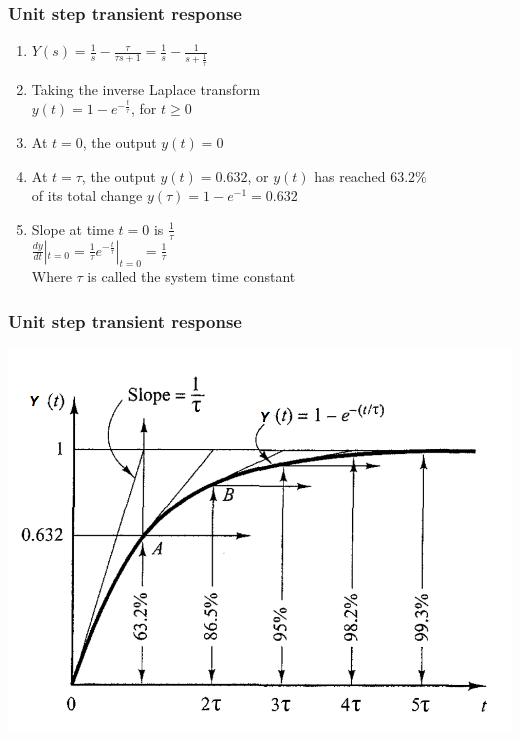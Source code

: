 \begin{frame}
\frametitle{Unit step transient response}
\begin{enumerate}
\item$Y(s)= \frac{1}{s} - \frac{\tau}{\tau s +1} = \frac{1}{s} - \frac{1}{s+\frac{1}{\tau}}$
\vspace{0.2cm}
\item Taking the inverse Laplace transform
\vspace{0.2cm}
\\ $y(t) = 1 - e^{-\frac{t}{\tau}}$, for $t\ge 0$ 
\vspace{0.2cm}
\item At $t=0$, the output $y(t)=0$
\vspace{0.2cm}
\item At $t=\tau$, the output $y(t)=0.632$, or $y(t)$ has reached $63.2\% $ 
\vspace{0.01cm} 
\\ of its total change $y(\tau)= 1 - e^{-1} = 0.632$
\vspace{0.2cm}
\item Slope at time $t=0$ is $\frac{1}{\tau}$
\vspace{0.2cm}
\\ $\frac{dy}{dt}|_{t=0} = \frac{1}{\tau}e^{-\frac{t}{\tau}}|_{t=0} = \frac{1}{\tau}$
\vspace{0.2cm}
\\ Where $\tau$ is called the system time constant
\end{enumerate}
\end{frame}

\begin{frame}
\frametitle{Unit step transient response}
\includegraphics[width=0.8\linewidth]{Afbeelding2}
\end{frame}


